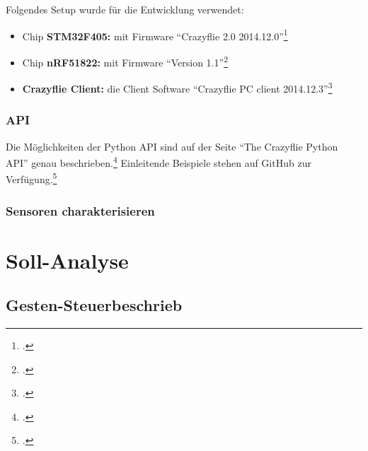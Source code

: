 Folgendes Setup wurde für die Entwicklung verwendet:
\begin{itemize}
	\item Chip \textbf{STM32F405:} mit Firmware "`Crazyflie 2.0 2014.12.0"'\footcite{bitcraze_crazyflie-firmware_2015-03-30}
	\item Chip \textbf{nRF51822:} mit Firmware "`Version 1.1"'\footcite{bitcraze_crazyflie2-nrf-firmware_2015-03-30}
	\item \textbf{Crazyflie Client:} die Client Software "`Crazyflie PC client 2014.12.3"'\footcite{bitcraze_crazyflie-clients-python_2015-03-30}
\end{itemize}


\subsubsection{API}
Die Möglichkeiten der Python API sind auf der Seite "`The Crazyflie Python API"' genau beschrieben.\footcite{doc_crazyflie_api_python_index_Bitcraze_Wiki_2015-03-30}
Einleitende Beispiele stehen auf GitHub zur Verfügung.\footcite{crazyflie-clients-python_examples_crazyflie-clients-python_2015-03-30}


\subsubsection{Sensoren charakterisieren}



\section{Soll-Analyse}
\subsection{Gesten-Steuerbeschrieb}


